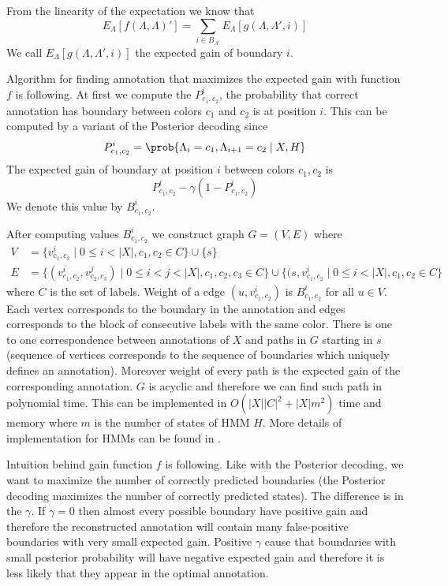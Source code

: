 From the linearity of the expectation we know that
\[E_{\Lambda}[f(\Lambda,\Lambda)']=\sum_{i\in
B_{\Lambda'}}E_{\Lambda}[g(\Lambda,\Lambda',i)]\] We call
$E_{\Lambda}[g(\Lambda,\Lambda',i)]$ the expected gain of boundary $i$.


Algorithm for finding annotation that maximizes the expected gain with function $f$
is following. At first we compute the $P^i_{c_1,c_2}$, the probability that correct annotation
has boundary between colors $c_1$ and $c_2$ is at position $i$. This can be
computed by a variant of the Posterior decoding
since 
\[P_{c_1,c_2}^i=\prob{\Lambda_i=c_1,\Lambda_{i+1}=c_2\mid X,H}\]  
  The expected gain of
boundary at position $i$ between colors $c_1,c_2$  is 
\[P^i_{c_1,c_2}-\gamma (1-P^i_{c_1,c_2})\]
We denote this value by  $B^i_{c_1,c_2}$.

After computing values $B^i_{c_1,c_2}$ we construct graph $G=(V,E)$ where
\begin{align*}
V&=\{v^i_{c_1,c_2}\mid 0\leq i<|X|,c_1,c_2\in C\}\cup\{s\}\\
E&=\{(v^i_{c_1,c_2},v^j_{c_2,c_3})\mid 0\leq i<j< |X|, c_1,c_2,c_3\in C
\}\cup\{(s,v^i_{c_1,c_2}\mid 0\leq i< |X|, c_1,c_2\in C\} 
\end{align*}
where $C$ is the set
of labels. Weight of a edge $(u,v^i_{c_1,c_2})$ is $B^i_{c_1,c_2}$ for all $u\in
V$. Each vertex corresponds to the boundary in the annotation and edges
corresponds to the  block of consecutive labels with the same
color.
There is one to one correspondence between annotations of $X$ and paths in
$G$ starting in $s$ (sequence of vertices corresponds to the sequence of
boundaries which uniquely defines an annotation). Moreover weight of every path
is the expected gain of
the corresponding annotation. $G$ is acyclic and therefore we can find such path in
polynomial time. This can be implemented in $O(|X||C|^2+|X|m^2)$ time and memory
where $m$ is the number of states of HMM $H$. More details of implementation
for HMMs can be found in
\cite{Nanasi2010mgr}.

Intuition behind gain function $f$ is following. Like with the Posterior
decoding, we want to maximize the number of correctly predicted boundaries (the
Posterior decoding maximizes the number of correctly predicted states). The
difference is in the $\gamma$. If $\gamma=0$ then almost every possible boundary
have positive gain and therefore the reconstructed annotation will contain many
false-positive boundaries with very small expected gain. Positive $\gamma$ cause
that boundaries with small posterior probability will have negative expected
gain and therefore it is less likely that they appear in the optimal annotation.



